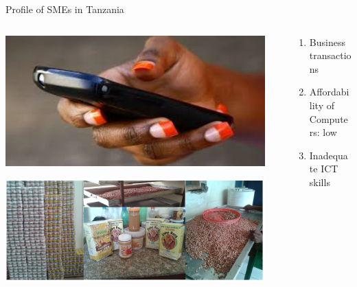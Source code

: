 \documentclass{beamer}
\begin{document}
\begin{frame}{Profile of SMEs in Tanzania}
	\begin{columns}
      \begin{column}{0.35\textwidth}
        \begin{center}
        \includegraphics[width=0.95\textwidth]{figs/mob}
        \end{center}
        \begin{center}
         \includegraphics[width=0.95\textwidth]{figs/home}
         \end{center}
      \end{column}
    \begin{column}{0.65\textwidth}
		\begin{enumerate}
		 \item Business transactions
		 \item Affordability of Computers: low
		 \item Inadequate ICT skills
	  \end{enumerate}
	  \end{column}
     \end{columns}
  
\end{frame}
\end{document}
